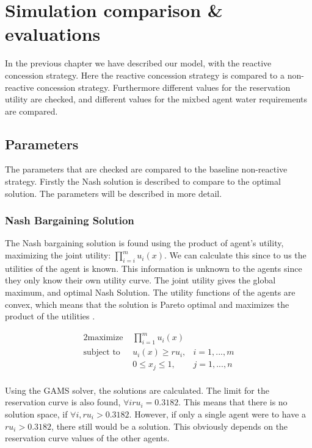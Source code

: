 \chapter{Simulation comparison \& evaluations}
In the previous chapter we have described our model, with the reactive concession strategy. Here the reactive concession strategy is compared to a non-reactive concession strategy. Furthermore different values for the reservation utility are checked, and different values for the mixbed agent water requirements are compared. 

\section{Parameters}
The parameters that are checked are compared to the baseline non-reactive strategy. Firstly the Nash solution is described to compare to the optimal solution. The parameters will be described in more detail.

\subsection{Nash Bargaining Solution}
The Nash bargaining solution is found using the product of agent's utility, maximizing the joint utility: $\prod_{i=i}^{m}u_i(x).$ We can calculate this since to us the utilities of the agent is known. This information is unknown to the agents since they only know their own utility curve. The joint utility gives the global maximum, and optimal Nash Solution. The utility functions of the agents are convex, which means that the solution is Pareto optimal and maximizes the product of the utilities \citep{nash1950bargaining, roth1977individual, lensberg1988stability}. 

\begin{alignat*}{2}
\text{maximize }   	& \prod_{i=1}^m u_i(x)  \\
\text{subject to \ } 	& u_i(x) \geq ru_i, & i = 1,...,m\\
& 0\leq x_j\leq 1, & j = 1,...,n\\
\end{alignat*}

Using the GAMS solver, the solutions are calculated. The limit for the reservation curve is also found, $\forall i ru_i = 0.3182$. This means that there is no solution space, if $\forall i, ru_i > 0.3182$. However, if only a single agent were to have a $ru_i > 0.3182$, there still would be a solution. This obviously depends on the reservation curve values of the other agents. 

